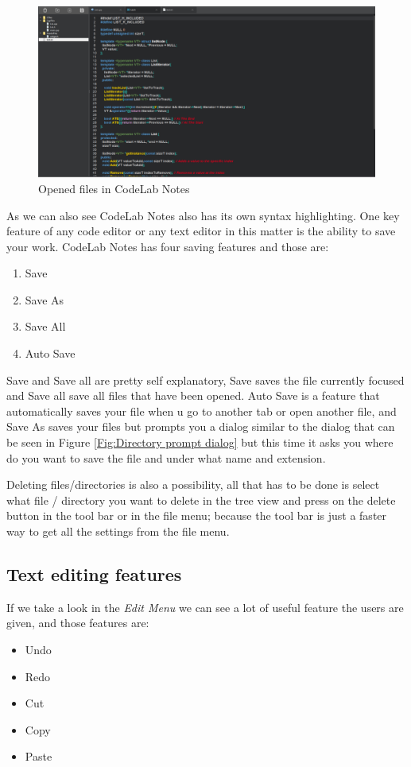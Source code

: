 \documentclass[a4paper, 11pt]{article}
\begin{document}
				\begin{figure}[h]
					\centering
					\includegraphics[width = \linewidth]{openedFiles}
					\caption{Opened files in CodeLab Notes}
					\label{Fig:Opened Files}
				\end{figure}
			
				\noindent As we can also see CodeLab Notes also has its own syntax highlighting. One key feature of any code editor or any text editor in this matter is the ability to save your work. CodeLab Notes has four saving features and those are:
				\begin{enumerate}
					\item Save
					\item Save As
					\item Save All
					\item Auto Save
				\end{enumerate}
			
				\noindent Save and Save all are pretty self explanatory, Save saves the file currently focused and Save all save all files that have been opened. Auto Save is a feature that automatically saves your file when u go to another tab or open another file, and Save As saves your files but prompts you a dialog similar to the dialog that can be seen in Figure \ref{Fig:Directory prompt dialog} but this time it asks you where do you want to save the file and under what name and extension. \\ \vspace{1mm}
				
				\noindent Deleting files/directories is also a possibility, all that has to be done is select what file / directory you want to delete in the tree view and press on the delete button in the tool bar or in the file menu; because the tool bar is just a faster way to get all the settings from the file menu.
				
			\subsection{Text editing features}
				\noindent If we take a look in the \emph{Edit Menu} we can see a lot of useful feature the users are given, and those features are:
				\begin{itemize}
					\item Undo
					\item Redo
					\item Cut
					\item Copy
					\item Paste
				\end{itemize}
			
\end{document}
